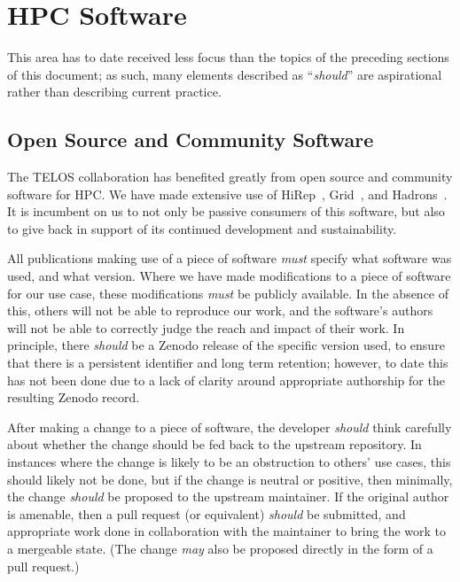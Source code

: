 \documentclass{article}
\newcommand\rfcword[1]{\emph{#1}\xspace}
\newcommand\must{\rfcword{must}}
\newcommand\should{\rfcword{should}}
\newcommand\may{\rfcword{may}}
\begin{document}
\section{HPC Software}\label{sec:hpc-software}

This area has to date received less focus than
the topics of the preceding sections of this document;
as such,
many elements described as ``\should'' are aspirational
rather than describing current practice.


\subsection{Open Source and Community Software}

The TELOS collaboration has benefited greatly from open source and community software for HPC\@.
We have made extensive use of HiRep~\cite{hirep,DelDebbio:2008zf},
Grid~\cite{grid,Yamaguchi:2022feu},
and Hadrons~\cite{hadrons,antonin_portelli_2023_8023716}.
It is incumbent on us to not only be passive consumers of this software,
but also to give back in support of its continued development and sustainability.

All publications making use of a piece of software
\must specify what software was used,
and what version.
Where we have made modifications to a piece of software for our use case,
these modifications \must be publicly available.
In the absence of this,
others will not be able to reproduce our work,
and the software's authors will not be able to correctly judge
the reach and impact of their work.
In principle,
there \should be a Zenodo release of the specific version used,
to ensure that there is a persistent identifier and long term retention;
however,
to date this has not been done due to
a lack of clarity around appropriate authorship for the resulting Zenodo record.

After making a change to a piece of software,
the developer \should think carefully about whether
the change should be fed back to the upstream repository.
In instances where the change is likely to be an obstruction to others' use cases,
this should likely not be done,
but if the change is neutral or positive,
then minimally,
the change \should be proposed to the upstream maintainer.
If the original author is amenable,
then a pull request
(or equivalent)
\should be submitted,
and appropriate work done in collaboration with the maintainer
to bring the work to a mergeable state.
(The change \may also be proposed directly in the form of a pull request.)
\end{document}
